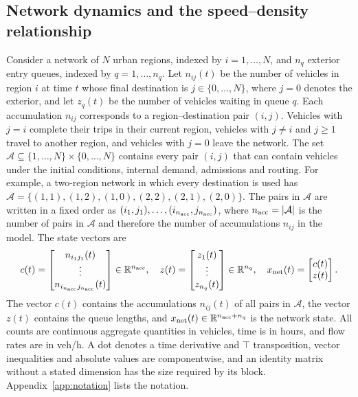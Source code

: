 \documentclass[final]{cas-sc}
\theoremstyle{definition}
\theoremstyle{plain}
\theoremstyle{definition}
\theoremstyle{plain}
\newcommand{\R}{\mathbb{R}}
\newcommand{\appref}[1]{Appendix~\ref{#1}}
\begin{document}
\subsection{Network dynamics and the speed--density relationship}
\label{app:new-model}

Consider a network of $N$ urban regions, indexed by $i=1,\ldots,N$, and
$n_q$ exterior entry queues, indexed by $q=1,\ldots,n_q$. Let $n_{ij}(t)$
be the number of vehicles in region $i$ at time $t$ whose final
destination is $j\in\{0,\ldots,N\}$, where $j=0$ denotes the exterior,
and let $z_q(t)$ be the number of vehicles waiting in queue $q$. Each
accumulation $n_{ij}$ corresponds to a region--destination pair $(i,j)$.
Vehicles with $j=i$ complete their trips in their current region,
vehicles with $j\ne i$ and $j\ge1$ travel to another region, and
vehicles with $j=0$ leave the network. The set
$\mathcal A\subseteq\{1,\ldots,N\}\times\{0,\ldots,N\}$ contains every
pair $(i,j)$ that can contain vehicles under the initial conditions,
internal demand, admissions and routing. For example, a two-region
network in which every destination is used has
$\mathcal A=\{(1,1),(1,2),(1,0),(2,2),(2,1),(2,0)\}$. The pairs in
$\mathcal A$ are written in a fixed order as
$(i_1,j_1),\ldots,(i_{n_{\rm acc}},j_{n_{\rm acc}})$, where
$n_{\rm acc}=|\mathcal A|$ is the number of pairs in $\mathcal A$ and
therefore the number of accumulations $n_{ij}$ in the model. The state
vectors are
\[
c(t)=\begin{bmatrix}
n_{i_1j_1}(t)\\ \vdots\\ n_{i_{n_{\rm acc}}j_{n_{\rm acc}}}(t)
\end{bmatrix}\in\R^{n_{\rm acc}},
\quad
z(t)=\begin{bmatrix}z_1(t)\\ \vdots\\z_{n_q}(t)\end{bmatrix}\in\R^{n_q},
\quad
x_{\rm net}(t)=\begin{bmatrix}c(t)\\z(t)\end{bmatrix}.
\]
The vector $c(t)$ contains the accumulations $n_{ij}(t)$ of all pairs
in $\mathcal A$, the vector $z(t)$ contains the queue lengths, and
$x_{\rm net}(t)\in\R^{n_{\rm acc}+n_q}$ is the network state. All counts are continuous aggregate quantities in
vehicles, time is in hours, and flow rates are in veh/h. A dot denotes
a time derivative and $\top$ transposition, vector inequalities and
absolute values are componentwise, and an identity matrix without a
stated dimension has the size required by its block.
\appref{app:notation} lists the notation.
\end{document}
